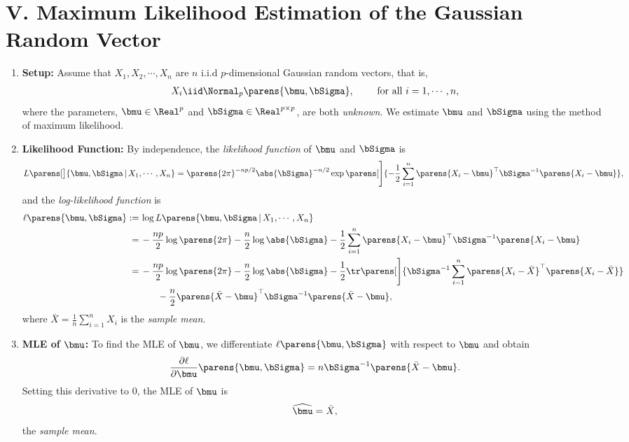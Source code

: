 \documentclass[12pt]{article}
\begin{document}
\section*{V. Maximum Likelihood Estimation of the Gaussian Random Vector}

\begin{enumerate}[label=\textbf{\arabic*.}]

	\item \textbf{Setup:} Assume that $X_1, X_2, \cdots, X_n$ are $n$ i.i.d $p$-dimensional Gaussian random vectors, that is, 
	\begin{align*}
		X_i \iid \Normal_p \parens{\bmu, \bSigma}, \qquad \text{ for all } i = 1, \cdots, n, 
	\end{align*}
	where the parameters, $\bmu \in \Real^{p}$ and $\bSigma \in \Real^{p \times p}$, are both \emph{unknown}. We estimate $\bmu$ and $\bSigma$ using the method of maximum likelihood. 
	
	\item \textbf{Likelihood Function:} By independence, the \textit{likelihood function} of $\bmu$ and $\bSigma$ is 
	\begin{align*}
		L \parens[\big]{\bmu, \bSigma \,\vert\, X_1, \cdots, X_n} = \parens{2 \pi}^{-np/2} \abs{\bSigma}^{-n/2} \exp \parens[\Bigg]{-\frac{1}{2} \sum_{i=1}^n \parens{X_i - \bmu}^\top \bSigma^{-1} \parens{X_i - \bmu}}, 
	\end{align*}
	and the \textit{log-likelihood function} is 
	\begin{align*}
		\ell \parens{\bmu, \bSigma} := & \, \log L \parens{\bmu, \bSigma \,\vert\, X_1, \cdots, X_n} \nonumber \\ 
		= & \, - \frac{np}{2} \log \parens{2 \pi} - \frac{n}{2} \log \abs{\bSigma} - \frac{1}{2} \sum_{i=1}^n \parens{X_i - \bmu}^\top \bSigma^{-1} \parens{X_i - \bmu} \nonumber \\ 
		= & \, - \frac{np}{2} \log \parens{2 \pi} - \frac{n}{2} \log \abs{\bSigma} - \frac{1}{2} \tr \parens[\Bigg]{\bSigma^{-1} \sum_{i=1}^n \parens{X_i - \bar{X}}^\top \parens{X_i - \bar{X}}} \nonumber \\ & \qquad 
		- \frac{n}{2} \parens{\bar{X} - \bmu}^\top \bSigma^{-1} \parens{\bar{X} - \bmu}, 
	\end{align*}
	where $\bar{X} = \frac{1}{n} \sum_{i=1}^n X_i$ is the \textit{sample mean}. 
	
	\item \textbf{MLE of $\bmu$:} To find the MLE of $\bmu$, we differentiate $\ell \parens{\bmu, \bSigma}$ with respect to $\bmu$ and obtain 
	\begin{align*}
		\frac{\partial \ell}{\partial \bmu} \parens{\bmu, \bSigma} = n \bSigma^{-1} \parens{\bar{X} - \bmu}. 
	\end{align*}
	Setting this derivative to 0, the MLE of $\bmu$ is 
	\begin{align*}
		\widehat{\bmu} = \bar{X}, 
	\end{align*}
	the \textit{sample mean}. 
	

\end{enumerate}
\end{document}
